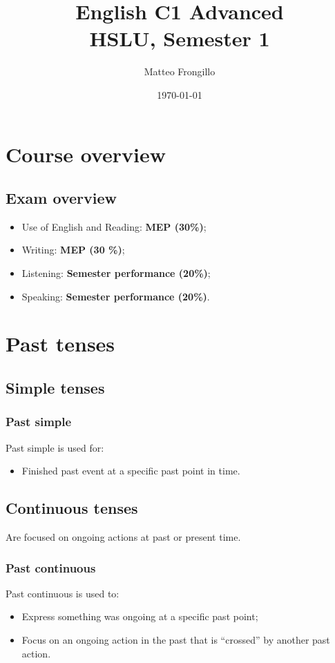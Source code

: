 \documentclass{article}
\title{\textbf{English C1 Advanced\\ HSLU, Semester 1}}
\author{Matteo Frongillo}
\date{\today}
\begin{document}
\maketitle
\tableofcontents
\pagebreak

\section{Course overview}
\subsection{Exam overview}
\begin{itemize}
    \item Use of English and Reading: \textbf{MEP (30\%)};
    \item Writing: \textbf{MEP (30 \%)};
    \item Listening: \textbf{Semester performance (20\%)};
    \item Speaking: \textbf{Semester performance (20\%)}.
\end{itemize}


\newpage
\section{Past tenses}

\subsection{Simple tenses}
\subsubsection{Past simple}
Past simple is used for:
\begin{itemize}
    \item Finished past event at a specific past point in time. 
\end{itemize}

\subsection{Continuous tenses}
Are focused on ongoing actions at past or present time.

\subsubsection{Past continuous}
Past continuous is used to:
\begin{itemize}
    \item Express something was ongoing at a specific past point;
    \item Focus on an ongoing action in the past that is ``crossed''
        by another past action.
\end{itemize}
\end{document}
